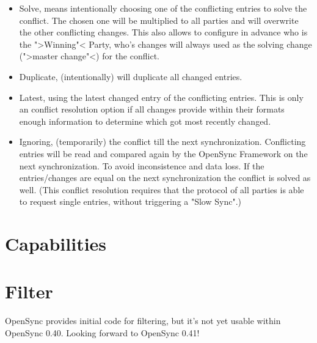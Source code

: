 \begin{itemize}
\item Solve, means intentionally choosing one of the conflicting entries to
solve the conflict. The chosen one will be multiplied to all parties and will
overwrite the other conflicting changes. This also allows to configure in
advance who is the ">Winning"< Party, who's changes will always used as the 
solving change (">master change"<) for the conflict.
\item Duplicate, (intentionally) will duplicate all changed entries. 
\item Latest, using the latest changed entry of the conflicting entries. This is
only an conflict resolution option if all changes provide within their formats
enough information to determine which got most recently changed.
\item Ignoring, (temporarily) the conflict till the next synchronization.
Conflicting entries will be read and compared again by the OpenSync Framework on
the next synchronization. To avoid inconsistence and data loss. If the
entries/changes are equal on the next synchronization the conflict is solved as
well. (This conflict resolution requires that the protocol of all parties is
able to request single entries, without triggering a "Slow Sync".)
\end{itemize}
\section{Capabilities}
\section{Filter}
OpenSync provides initial code for filtering, but it's not yet usable within
OpenSync 0.40. Looking forward to OpenSync 0.41!

